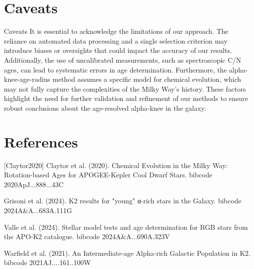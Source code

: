\documentclass[twocolumn]{aastex631}
\begin{document}
\section{Caveats}
Caveats
It is essential to acknowledge the limitations of our approach. The reliance on automated data processing and a single selection criterion may introduce biases or oversights that could impact the accuracy of our results. Additionally, the use of uncalibrated measurements, such as spectroscopic C/N ages, can lead to systematic errors in age determination. Furthermore, the alpha-knee-age-radius method assumes a specific model for chemical evolution, which may not fully capture the complexities of the Milky Way's history. These factors highlight the need for further validation and refinement of our methods to ensure robust conclusions about the age-resolved alpha-knee in the galaxy.
\section*{References}
\footnotesize
[Claytor2020] Claytor et al. (2020). Chemical Evolution in the Milky Way: Rotation-based Ages for APOGEE-Kepler Cool Dwarf Stars. bibcode 2020ApJ...888...43C \par [Grisoni2024] Grisoni et al. (2024). K2 results for "young" α-rich stars in the Galaxy. bibcode 2024A\&A...683A.111G \par [Valle2024] Valle et al. (2024). Stellar model tests and age determination for RGB stars from the APO-K2 catalogue. bibcode 2024A\&A...690A.323V \par [Warfield2021] Warfield et al. (2021). An Intermediate-age Alpha-rich Galactic Population in K2. bibcode 2021AJ....161..100W
\end{document}
